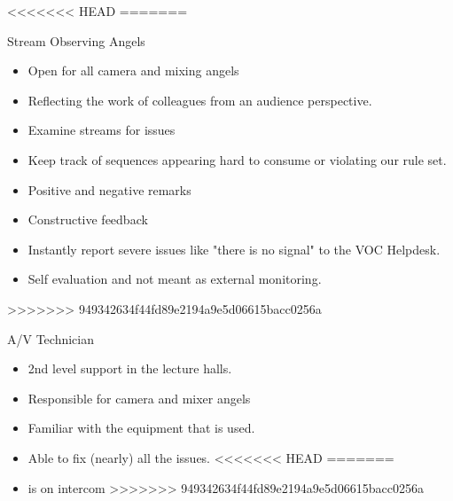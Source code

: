 \documentclass[aspectratio=169]{beamer}
\begin{document}
<<<<<<< HEAD
=======
\begin{frame}{Stream Observing Angels}
	\begin{itemize}
		\item Open for all camera and mixing angels
		\item Reflecting the work of colleagues from an audience perspective.
		\item Examine streams for issues 
		\item Keep track of sequences appearing hard to consume or violating our rule set. 
		\item Positive and negative remarks 
		\item Constructive feedback 
		\item Instantly report severe issues like "there is no signal" to the VOC Helpdesk.%
		\item Self evaluation and not meant as external monitoring. 
	\end{itemize}
\end{frame}
>>>>>>> 949342634f44fd89e2194a9e5d06615bacc0256a

\begin{frame}{A/V Technician}
	\begin{itemize}
		\item 2nd level support in the lecture halls. 
		\item Responsible for camera and mixer angels
		\item Familiar with the equipment that is used. 
		\item Able to fix (nearly) all the issues. 
<<<<<<< HEAD
=======
		\item is on intercom %
>>>>>>> 949342634f44fd89e2194a9e5d06615bacc0256a
	\end{itemize}
\end{frame}
\end{document}
